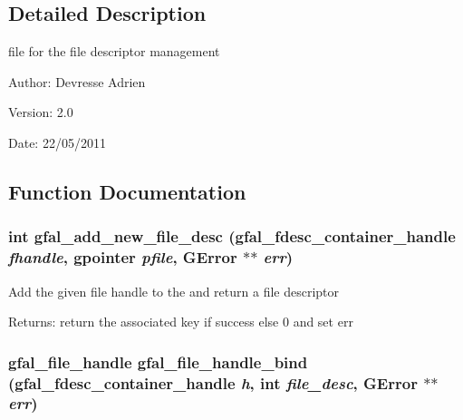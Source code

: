 \subsection{Detailed Description}
file for the file descriptor management 

\begin{Desc}
\item[Author:]Devresse Adrien \end{Desc}
\begin{Desc}
\item[Version:]2.0 \end{Desc}
\begin{Desc}
\item[Date:]22/05/2011 \end{Desc}


\subsection{Function Documentation}
\subsubsection{\setlength{\rightskip}{0pt plus 5cm}int gfal\_\-add\_\-new\_\-file\_\-desc (gfal\_\-fdesc\_\-container\_\-handle {\em fhandle}, gpointer {\em pfile}, GError $\ast$$\ast$ {\em err})}\label{gfal__common__filedescriptor_8c_8ab30d677c0c3d4a635a35c395524fea}


Add the given file handle to the and return a file descriptor \begin{Desc}
\item[Returns:]return the associated key if success else 0 and set err \end{Desc}
\subsubsection{\setlength{\rightskip}{0pt plus 5cm}gfal\_\-file\_\-handle gfal\_\-file\_\-handle\_\-bind (gfal\_\-fdesc\_\-container\_\-handle {\em h}, int {\em file\_\-desc}, GError $\ast$$\ast$ {\em err})}\label{gfal__common__filedescriptor_8c_b1a9b764baa7c997a354d18bbe43e2cb}


